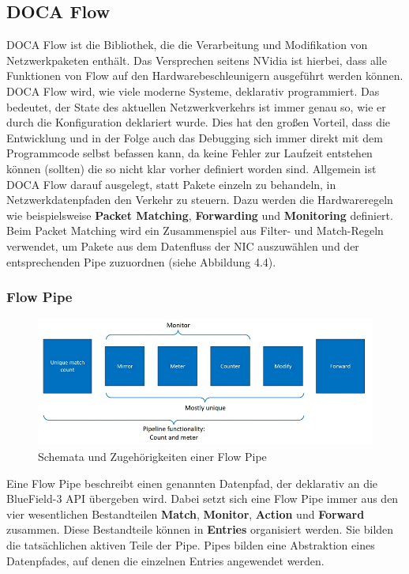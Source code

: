 \subsection{DOCA Flow}
DOCA Flow ist die Bibliothek, die die Verarbeitung und Modifikation von Netzwerkpaketen enthält. Das Versprechen seitens NVidia ist hierbei, dass alle Funktionen von Flow auf den Hardwarebeschleunigern ausgeführt werden können. DOCA Flow wird, wie viele moderne Systeme, deklarativ programmiert. Das bedeutet, der State des aktuellen Netzwerkverkehrs ist immer genau so, wie er durch die Konfiguration deklariert wurde. Dies hat den großen Vorteil, dass die Entwicklung und in der Folge auch das Debugging sich immer direkt mit dem Programmcode selbst befassen kann, da keine Fehler zur Laufzeit entstehen können (sollten) die so nicht klar vorher definiert worden sind.
Allgemein ist DOCA Flow darauf ausgelegt, statt Pakete einzeln zu behandeln, in Netzwerkdatenpfaden den Verkehr zu steuern. Dazu werden die Hardwareregeln wie beispielsweise \textbf{Packet Matching}, \textbf{Forwarding} und \textbf{Monitoring} definiert. Beim Packet Matching wird ein Zusammenspiel aus Filter- und Match-Regeln verwendet, um Pakete aus dem Datenfluss der NIC auszuwählen und der entsprechenden Pipe zuzuordnen (siehe Abbildung 4.4). \cite{nvidia_doca_flow_2025}
\subsubsection{Flow Pipe}
\begin{figure}
    \centering
    \includegraphics[width=1\linewidth]{images/pipe.png}
    \caption{Schemata und Zugehörigkeiten einer Flow Pipe}
    \label{fig:enter-label}
\end{figure}
Eine Flow Pipe beschreibt einen genannten Datenpfad, der deklarativ an die BlueField-3 API übergeben wird. Dabei setzt sich eine Flow Pipe immer aus den vier wesentlichen Bestandteilen \textbf{Match}, \textbf{Monitor}, \textbf{Action} und \textbf{Forward} zusammen. Diese Bestandteile können in \textbf{Entries} organisiert werden. Sie bilden die tatsächlichen aktiven Teile der Pipe. Pipes bilden eine Abstraktion eines Datenpfades, auf denen die einzelnen Entries angewendet werden.

